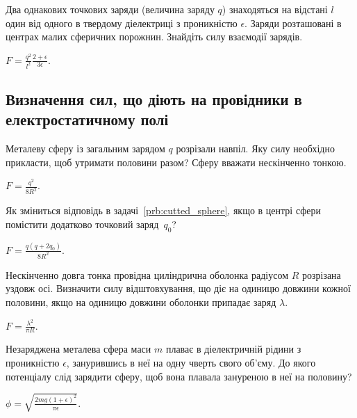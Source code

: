 \begin{problem}
    Два однакових точкових заряди (величина заряду $q$) знаходяться на відстані $l$ один від одного в твердому діелектриці з проникністю $\epsilon$. Заряди розташовані в центрах малих сферичних порожнин. Знайдіть силу взаємодії зарядів.
\begin{solution}
	$ F = \frac{q^2}{l^2} \frac{2 + \epsilon}{3\epsilon}.$
\end{solution}
\end{problem}


\subsection*{Визначення сил, що діють на провідники в електростатичному полі}

\begin{problem}\label{prb:cutted_sphere}%
Металеву сферу із загальним зарядом $q$ розрізали навпіл. Яку силу необхідно прикласти, щоб утримати половини разом? Сферу вважати нескінченно тонкою.
\begin{solution}
	$F = \frac{q^2}{8R^2}$.
\end{solution}
\end{problem}

\begin{problem}
Як зміниться відповідь в задачі~\ref{prb:cutted_sphere}, якщо в центрі сфери помістити додатково точковий заряд~$q_0$?
\begin{solution}
	$F = \frac{q(q + 2q_0)}{8R^2}$.
\end{solution}
\end{problem}

\begin{problem}
Нескінченно довга тонка провідна циліндрична оболонка радіусом $ R $ розрізана уздовж осі. Визначити силу відштовхування, що діє на одиницю довжини кожної половини, якщо на одиницю довжини оболонки припадає заряд $ \lambda $.
\begin{solution}
	$F = \frac{\lambda^2}{\pi R}$.
\end{solution}
\end{problem}

\begin{problem}
Незаряджена металева сфера маси $m$ плаває в діелектричній рідини з проникністю $\epsilon$, занурившись в неї на одну чверть свого об'єму. До якого потенціалу слід зарядити сферу, щоб вона плавала зануреною в неї на половину?
\begin{solution}
	$\phi = \sqrt{\frac{2mg(1+\epsilon)^2}{\pi\epsilon}}$.
\end{solution}
\end{problem}

